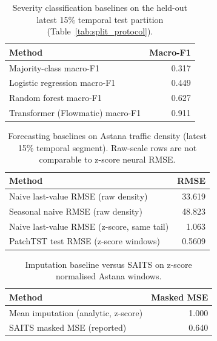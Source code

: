 \begin{table}[H]
  \centering
  \caption{Severity classification baselines on the held-out latest 15\% temporal test partition (Table~\ref{tab:split_protocol}).}
  \label{tab:baselines-class}
  \begin{tabular}{@{}lr@{}}
    \toprule
    Method & Macro-F1 \\
    \midrule
    
Majority-class macro-F1 & 0.317 \\
Logistic regression macro-F1 & 0.449 \\
Random forest macro-F1 & 0.627 \\
Transformer (Flowmatic) macro-F1 & 0.911 \\

    \bottomrule
  \end{tabular}
\end{table}

\begin{table}[H]
  \centering
  \caption{Forecasting baselines on Astana traffic density (latest 15\% temporal segment). Raw-scale rows are not comparable to z-score neural RMSE.}
  \label{tab:baselines-forecast}
  \begin{tabular}{@{}lr@{}}
    \toprule
    Method & RMSE \\
    \midrule
    
Naive last-value RMSE (raw density) & 33.619 \\
Seasonal naive RMSE (raw density) & 48.823 \\
Naive last-value RMSE (z-score, same tail) & 1.063 \\
PatchTST test RMSE (z-score windows) & 0.5609 \\

    \bottomrule
  \end{tabular}
\end{table}

\begin{table}[H]
  \centering
  \caption{Imputation baseline versus SAITS on z-score normalised Astana windows.}
  \label{tab:baselines-imputation}
  \begin{tabular}{@{}lr@{}}
    \toprule
    Method & Masked MSE \\
    \midrule
    
Mean imputation (analytic, z-score) & 1.000 \\
SAITS masked MSE (reported) & 0.640 \\

    \bottomrule
  \end{tabular}
\end{table}
